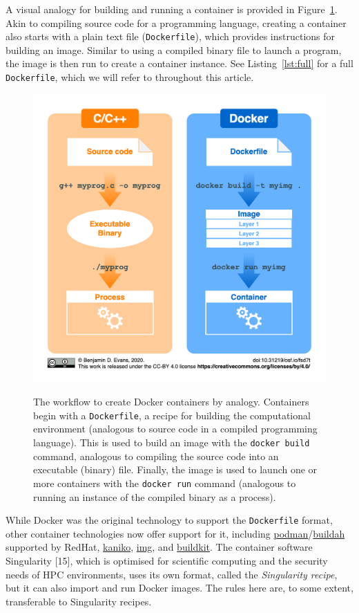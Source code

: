 \documentclass[10pt,letterpaper]{article}
\begin{document}
A visual analogy for building and running a container is provided in
Figure~\ref{fig:analogy}. Akin to compiling source code for a
programming language, creating a container also starts with a plain text
file (\texttt{Dockerfile}), which provides instructions for building an
image. Similar to using a compiled binary file to launch a program, the
image is then run to create a container instance. See
Listing~\ref{lst:full} for a full \texttt{Dockerfile}, which we will
refer to throughout this article.

\begin{figure}[h]
{\centering \includegraphics[width=1\linewidth]{figures/analogy} 
}
\caption{The workflow to create Docker containers by analogy. Containers begin with a \texttt{Dockerfile}, a recipe for building the computational environment (analogous to source code in a compiled programming language). This is used to build an image with the \texttt{docker build} command, analogous to compiling the source code into an executable (binary) file. Finally, the image is used to launch one or more containers with the \texttt{docker run} command (analogous to running an instance of the compiled binary as a process).}\label{fig:analogy}
\end{figure}

While Docker was the original technology to support the
\texttt{Dockerfile} format, other container technologies now offer
support for it, including
\href{https://podman.io/}{podman}/\href{https://github.com/containers/buildah}{buildah}
supported by RedHat,
\href{https://github.com/GoogleContainerTools/kaniko}{kaniko},
\href{https://github.com/genuinetools/img}{img}, and
\href{https://github.com/moby/buildkit}{buildkit}. The container
software Singularity {[}15{]}, which is optimised for scientific
computing and the security needs of HPC environments, uses its own
format, called the \emph{Singularity recipe}, but it can also import and
run Docker images. The rules here are, to some extent, transferable to
Singularity recipes.
\end{document}
